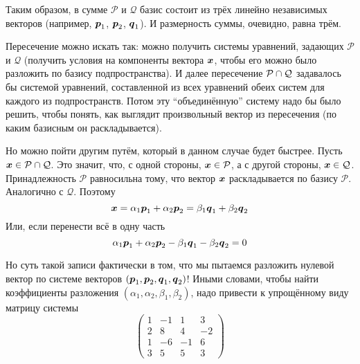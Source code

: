 \documentclass[a4paper,12pt]{article}
\begin{document}
\begin{solution}
    Таким образом, в сумме $\mathcal P$ и $\mathcal Q$ базис состоит из трёх линейно независимых векторов (например, $\boldsymbol p_1$, $\boldsymbol p_2$, $\boldsymbol q_1$).
    И размерность суммы, очевидно, равна трём.
    
    Пересечение можно искать так: можно получить системы уравнений, задающих $\mathcal P$ и $\mathcal Q$ (получить условия на компоненты вектора $\boldsymbol x$, чтобы его можно было разложить по базису подпространства).
    И далее пересечение $\mathcal P \hm\cap \mathcal Q$ задавалось бы системой уравнений, составленной из всех уравнений обеих систем для каждого из подпространств.
    Потом эту ``объединённую'' систему надо бы было решить, чтобы понять, как выглядит произвольный вектор из пересечения (по каким базисным он раскладывается).
    
    Но можно пойти другим путём, который в данном случае будет быстрее.
    Пусть $\bds x \hm\in \mathcal P \hm\cap \mathcal Q$.
    Это значит, что, с одной стороны,  $\bds x \hm\in \mathcal P$, а с другой стороны, $\bds x \hm\in \mathcal Q$.
    Принадлежность $\mathcal P$ равносильна тому, что вектор $\boldsymbol x$ раскладывается по базису $\mathcal P$.
    Аналогично с $\mathcal Q$.
    Поэтому
    \[
      \boldsymbol x = \alpha_1 \boldsymbol p_1 + \alpha_2 \boldsymbol p_2 = \beta_1 \boldsymbol q_1 + \beta_2 \boldsymbol q_2
    \]
    Или, если перенести всё в одну часть
    \begin{equation}\label{p-21-7-combination}
      \alpha_1 \boldsymbol p_1 + \alpha_2 \boldsymbol p_2 - \beta_1 \boldsymbol q_1 - \beta_2 \boldsymbol q_2 = 0
    \end{equation}
    
    Но суть такой записи фактически в том, что мы пытаемся разложить нулевой вектор по системе векторов $(\boldsymbol p_1, \boldsymbol p_2, \boldsymbol q_1, \boldsymbol q_2)$!
    Иными словами, чтобы найти коэффициенты разложения $(\alpha_1, \alpha_2, \beta_1, \beta_2)$, надо привести к упрощённому виду матрицу системы
    \[
      \begin{pmatrix}
        1 & -1 & 1 & 3\\
        2 & 8 & 4 & -2\\
        1 & -6 & -1 & 6\\
        3 & 5 & 5 & 3
      \end{pmatrix}
    \]
    

\end{solution}
\end{document}
